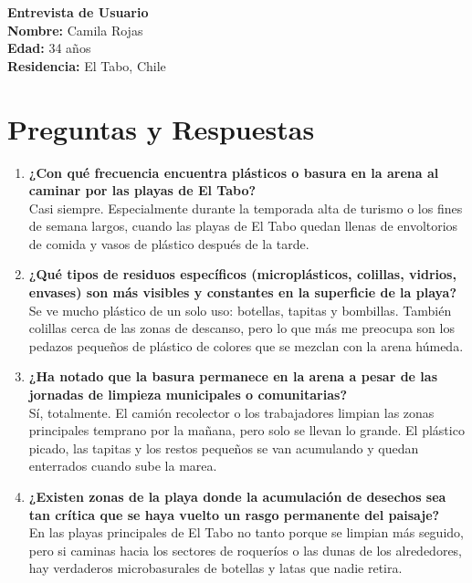 \documentclass[12pt,letterpaper]{article}
\begin{document}
\begin{center}
	{\LARGE \textbf{Entrevista de Usuario}} \\
	\vspace{0.5cm}
	\textbf{Nombre:} Camila Rojas \\
	\textbf{Edad:} 34 años \\
	\textbf{Residencia:} El Tabo, Chile
\end{center}

\vspace{0.8cm}

\section*{Preguntas y Respuestas}

\begin{enumerate}[leftmargin=*]
	\item \textbf{¿Con qué frecuencia encuentra plásticos o basura en la arena al caminar por las playas de El Tabo?} \\
	      Casi siempre. Especialmente durante la temporada alta de turismo o los fines de semana largos, cuando las playas de El Tabo quedan llenas de envoltorios de comida y vasos de plástico después de la tarde.

	\item \textbf{¿Qué tipos de residuos específicos (microplásticos, colillas, vidrios, envases) son más visibles y constantes en la superficie de la playa?} \\
	      Se ve mucho plástico de un solo uso: botellas, tapitas y bombillas. También colillas cerca de las zonas de descanso, pero lo que más me preocupa son los pedazos pequeños de plástico de colores que se mezclan con la arena húmeda.

	\item \textbf{¿Ha notado que la basura permanece en la arena a pesar de las jornadas de limpieza municipales o comunitarias?} \\
	      Sí, totalmente. El camión recolector o los trabajadores limpian las zonas principales temprano por la mañana, pero solo se llevan lo grande. El plástico picado, las tapitas y los restos pequeños se van acumulando y quedan enterrados cuando sube la marea.

	\item \textbf{¿Existen zonas de la playa donde la acumulación de desechos sea tan crítica que se haya vuelto un rasgo permanente del paisaje?} \\
	      En las playas principales de El Tabo no tanto porque se limpian más seguido, pero si caminas hacia los sectores de roqueríos o las dunas de los alrededores, hay verdaderos microbasurales de botellas y latas que nadie retira.


\end{enumerate}
\end{document}
